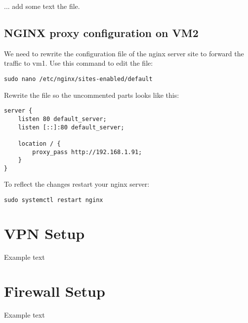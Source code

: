 \documentclass[10pt,a4paper]{article}
\begin{document}
... add some text the file.

\subsection{NGINX proxy configuration on VM2}
We need to rewrite the configuration file of the nginx server site to forward the traffic to vm1. Use this command to edit the file:
\begin{verbatim}
sudo nano /etc/nginx/sites-enabled/default
\end{verbatim}

Rewrite the file so the uncommented parts looks like this:
\begin{verbatim}
server {
	listen 80 default_server;
	listen [::]:80 default_server;
	
	location / {
		proxy_pass http://192.168.1.91;
	}
}
\end{verbatim}

To reflect the changes restart your nginx server:
\begin{verbatim}
sudo systemctl restart nginx
\end{verbatim}

\newpage
\section{VPN Setup}
Example text

\newpage
\section{Firewall Setup}
Example text
\end{document}
